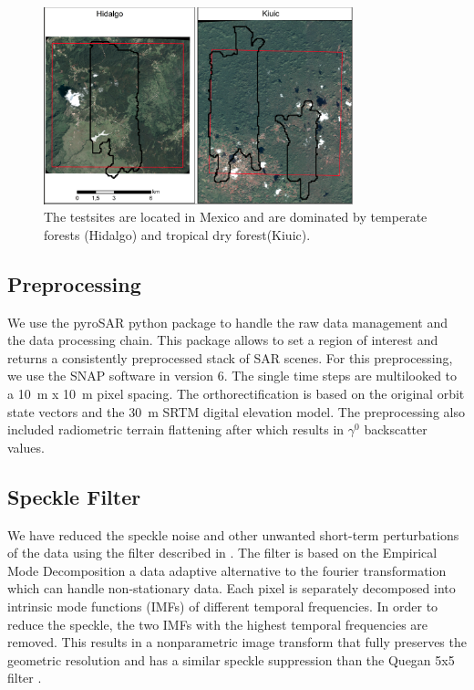 \documentclass{article}
\begin{document}
\begin{figure}
  \includegraphics[width=0.8\textwidth]{figs/SEN4REDD_testsites.png}
  \caption{The testsites are located in Mexico and are dominated by temperate forests (Hidalgo) and tropical dry forest(Kiuic).}
  \label{testsites}
\end{figure}

\subsection{Preprocessing}

We use the pyroSAR python package \cite{pyroSAR} to handle the raw data management and the data processing chain.
This package allows to set a region of interest and returns  a consistently preprocessed stack of SAR scenes.
For this preprocessing, we use the SNAP software \cite{SNAP} in version 6.
The single time steps are multilooked to a \SI{10}{\m} x \SI{10}{\m} pixel spacing.
The orthorectification is based on the original orbit state vectors and the \SI{30}{\m} SRTM digital elevation model\cite{SRTM}.
The preprocessing also included radiometric terrain flattening after \cite{Small} which results in $\gamma^0$ backscatter values.

\subsection{Speckle Filter}
We have reduced the speckle noise and other unwanted short-term perturbations of the data using the filter described in \cite{Cremer2018}.
The filter is based on the Empirical Mode Decomposition a data adaptive alternative to the fourier transformation which can handle non-stationary data.
Each pixel is separately decomposed into intrinsic mode functions (IMFs) of different temporal frequencies. 
In order to reduce the speckle, the two IMFs with the highest temporal frequencies are removed.
This results in a nonparametric image transform that fully preserves the geometric resolution and has a similar speckle suppression than the Quegan 5x5 filter \cite{Quegan_2001}. 
\end{document}
